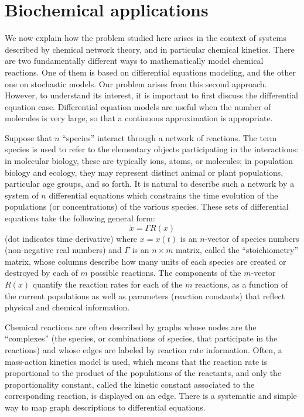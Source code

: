 \documentclass[11pt]{article}
\begin{document}
\section{Biochemical applications}
\label{sec:chem}

We now explain how the problem studied here arises in the context
of systems described by chemical network theory, and in particular
chemical kinetics.
There are two fundamentally different ways to mathematically model chemical
reactions.  One of them is based on differential equations modeling, and the
other one on stochastic models.  Our problem arises from this second approach.
However, to understand its interest, it is important to first discuss the
differential equation case.
Differential equation models are useful when the number of molecules is very
large, so that a continuous approximation is appropriate.

Suppose that $n$ ``species'' interact through a network of reactions. 
The term species is used to refer to the elementary objects participating in
the interactions: in molecular biology, these are typically ions, atoms, or
molecules; in population biology and ecology, they may represent distinct
animal or plant populations, particular age groups, and so forth.
It is natural to describe such a network by a system of $n$ differential
equations which constrains the time evolution of the populations
(or concentrations) of the various species. 
These sets of differential equations take the following general form:
\[
\dot x = \Gamma  R(x)
\]
(dot indicates time derivative)
where $x=x(t)$ is an $n$-vector of species numbers (non-negative
real numbers) and $\Gamma $ is an $n\times m$ matrix, called the ``stoichiometry'' matrix,
whose columns describe how many units of each species are created or destroyed
by each of $m$ possible reactions.  The components of the
$m$-vector $R(x)$ quantify the reaction rates for each of the $m$ reactions, as
a function of the current populations as well as parameters (reaction
constants) that reflect physical and chemical information.

Chemical reactions are often described by graphs whose nodes are the
``complexes'' (the species, or combinations of species, that participate
in the reactions) and whose edges are labeled by reaction rate information.
Often, a mass-action kinetics model is used, which means that the
reaction rate is proportional to the product of the populations of
the reactants, and only the proportionality constant, called the kinetic
constant associated to the corresponding reaction, is displayed on an edge.
There is a systematic and simple way to map graph descriptions to
differential equations.
\end{document}
